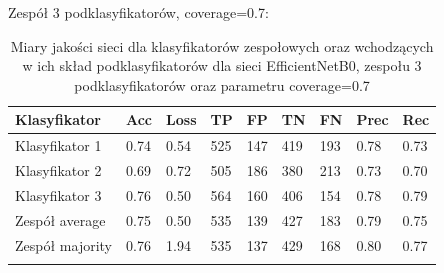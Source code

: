 \documentclass[polish,12pt]{aghthesis}
\begin{document}
\vspace{3mm}
\noindent Zespół 3 podklasyfikatorów, coverage=0.7:
\renewcommand{\arraystretch}{1.75}
 \begin{longtable}[h!]{|m{2.6cm}|m{1.2cm}|m{1.2cm}|m{1.2cm}|m{1.2cm}|m{1.2cm}|m{1.2cm}|m{1.2cm}|m{1.2cm}|}
 \hline
 Klasyfikator & Acc & Loss & TP & FP & TN & FN & Prec & Rec\\
 \hline
 Klasyfikator 1 & 0.74 & 0.54 & 525 & 147 & 419 & 193 & 0.78 & 0.73\\
 \hline
 Klasyfikator 2 & 0.69 & 0.72 & 505 & 186 & 380 & 213 & 0.73 & 0.70\\
 \hline
 Klasyfikator 3 & 0.76 & 0.50 & 564 & 160 & 406 & 154 & 0.78 & 0.79\\
 \hline
 Zespół average & 0.75 & 0.50 & 535 & 139 & 427 & 183 & 0.79 & 0.75\\ 
 \hline
 Zespół \newline majority & 0.76 & 1.94 & 535 & 137 & 429 & 168 & 0.80 & 0.77\\
 \hline
\caption{Miary jakości sieci dla klasyfikatorów zespołowych oraz wchodzących w ich skład podklasyfikatorów dla sieci EfficientNetB0, zespołu 3 podklasyfikatorów oraz parametru coverage=0.7}
\label{table:31}
\end{longtable}
\end{document}

